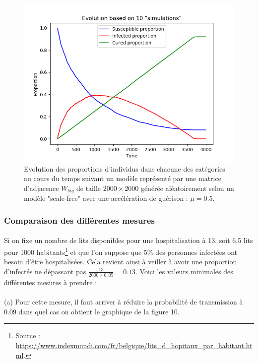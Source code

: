 \documentclass[a4paper, 12pt, oneside]{article}
\begin{document}
\begin{figure}[H]
	\centering
	\includegraphics[scale=1]{Wbig_dense_speeded_heal.png} 
	\caption{Evolution des proportions d'individus dans chacune des catégories au cours du temps suivant un modèle représenté par une matrice d'adjacence $W_{big}$ de taille $2000 \times 2000$ générée aléatoirement selon un modèle "scale-free" avec une accélération de guérison : $\mu = 0.5$.}
\end{figure}

\subsubsection{Comparaison des différentes mesures}

\paragraph{}Si on fixe un nombre de lits disponibles pour une hospitalisation à 13, soit 6,5 lits pour 1000 habitants\footnote{Source : \url{https://www.indexmundi.com/fr/belgique/lits_d_hopitaux_par_habitant.html}.} et que l'on suppose que 5\% des personnes infectées ont besoin d'être hospitalisées. Cela revient ainsi à veiller à avoir une proportion d'infectés ne dépassant pas $\frac{13}{2000 \times 0,05} = 0.13$. Voici les valeurs minimales des différentes mesures à prendre :

\paragraph{}(a) Pour cette mesure, il faut arriver à réduire la probabilité de transmission à 0.09 dans quel cas on obtient le graphique de la figure 10.
\end{document}
